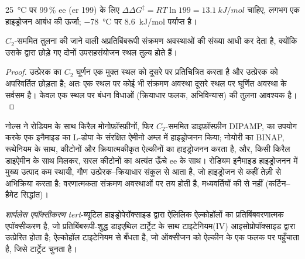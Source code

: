 \qty{25}{\celsius} पर 99\,\% ee (er 199) के लिए $\Delta\Delta G^\ddagger = RT\ln 199 = \qty{13.1}{kJ/mol}$ चाहिए, लगभग एक
हाइड्रोजन आबंध की ऊर्जा; \qty{-78}{\celsius} पर \qty{8.6}{kJ/mol} पर्याप्त है।

\begin{proposition}[$C_2$-सममित लिगैंड]\label{prop:b3:asymmetric-synthesis:c2}
$C_2$-सममित  तुलना की जाने वाली अप्रतिबिंबरूपी संक्रमण
अवस्थाओं की संख्या आधी कर देता है, क्योंकि उसके द्वारा छोड़े गए दोनों उपसहसंयोजन स्थल
तुल्य होते हैं।
\end{proposition}

\begin{proof}
उत्प्रेरक का $C_2$ घूर्णन एक मुक्त स्थल को दूसरे पर प्रतिचित्रित करता है और
उत्प्रेरक को अपरिवर्तित छोड़ता है; अतः एक स्थल पर कोई भी संक्रमण अवस्था दूसरे स्थल पर
घूर्णित अवस्था के सर्वसम है। केवल एक स्थल पर बंधन विधाओं (क्रियाधार फलक,
अभिविन्यास) की तुलना आवश्यक है।
\end{proof}

नोल्स ने रोडियम के साथ किरैल मोनोफ़ॉस्फ़ीनों, फिर $C_2$-सममित डाइफ़ॉस्फ़ीन DIPAMP, का उपयोग करके
एक इनैमाइड का L-डोपा के संरक्षित ऐमीनो अम्ल में हाइड्रोजनन किया; नोयोरी का BINAP,
रूथेनियम के साथ, कीटोनों और क्रियात्मकीकृत ऐल्कीनों का हाइड्रोजनन करता है, और,
किसी किरैल डाइऐमीन के साथ मिलकर, सरल कीटोनों का अत्यंत ऊँचे ee के साथ। रोडियम इनैमाइड
हाइड्रोजनन में मुख्य उत्पाद कम स्थायी, गौण
उत्प्रेरक--क्रियाधार संकुल से आता है, जो हाइड्रोजन से कहीं तेज़ी से अभिक्रिया करता है:
वरणात्मकता संक्रमण अवस्थाओं पर तय होती है, मध्यवर्तियों की  से नहीं
(कर्टिन--हैमेट सिद्धांत)।

\begin{definition}[शार्पलेस एपॉक्सीकरण]\label{def:b3:asymmetric-synthesis:sharpless}
\emph{शार्पलेस एपॉक्सीकरण} \textit{tert}-ब्यूटिल हाइड्रोपेरॉक्साइड द्वारा
ऐलिलिक ऐल्कोहॉलों का प्रतिबिंबवरणात्मक एपॉक्सीकरण है,
जो प्रतिबिंबरूपी-शुद्ध डाइएथिल टार्ट्रेट के साथ टाइटेनियम(IV) आइसोप्रोपॉक्साइड द्वारा उत्प्रेरित होता है;
ऐल्कोहॉल टाइटेनियम से बँधता है, जो ऑक्सीजन को ऐल्कीन के एक फलक पर पहुँचाता है,
जिसे टार्ट्रेट चुनता है।
\end{definition}

